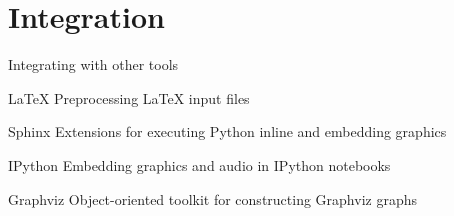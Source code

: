 \section{Integration}

\begin{frame}[fragile]{Integrating with other tools}
    \begin{block}{LaTeX}
        Preprocessing LaTeX input files
    \end{block}
    \begin{block}{Sphinx}
        Extensions for executing Python inline and embedding graphics
    \end{block}
    \begin{block}{IPython}
        Embedding graphics and audio in IPython notebooks
    \end{block}
    \begin{block}{Graphviz}
        Object-oriented toolkit for constructing Graphviz graphs
    \end{block}
\end{frame}